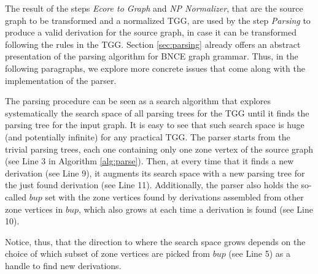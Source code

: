 The result of the steps \textit{Ecore to Graph} and \textit{NP Normalizer}, that are the source graph to be transformed and a normalized TGG, are used by the step \textit{Parsing} to produce a valid derivation for the source graph, in case it can be transformed following the rules in the TGG. Section \ref{sec:parsing} already offers an abstract presentation of the parsing algorithm for BNCE graph grammar. Thus, in the following paragraphs, we explore more concrete issues that come along with the implementation of the parser.

The parsing procedure can be seen as a search algorithm that explores systematically the search space of all parsing trees for the TGG until it finds the parsing tree for the input graph. It is easy to see that such search space is huge (and potentially infinite) for any practical TGG. The parser starts from the trivial parsing trees, each one containing only one zone vertex of the source graph (see Line 3 in Algorithm \ref{alg:parse}). Then, at every time that it finds a new derivation (see Line 9), it augments its search space with a new parsing tree for the just found derivation (see Line 11). Additionally, the parser also holds the so-called $bup$ set with the zone vertices found by derivations assembled from other zone vertices in $bup$, which also grows at each time a derivation is found (see Line 10).

Notice, thus, that the direction to where the search space grows depends on the choice of which subset of zone vertices are picked from $bup$ (see Line 5) as a handle to find new derivations.




